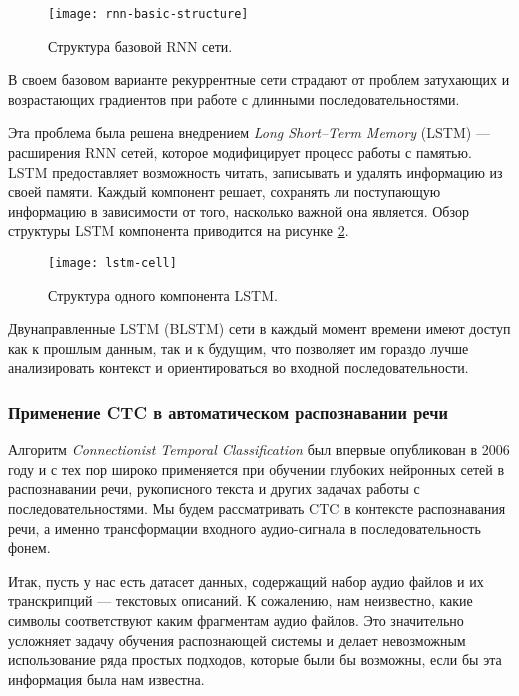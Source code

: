 \begin{figure}[h]
	\centering
	\texttt{[image: rnn-basic-structure]}
	\caption{Структура базовой RNN сети.}
	\label{fig:rnn-basic-structure}
\end{figure}

В своем базовом варианте рекуррентные сети страдают от проблем затухающих и возрастающих градиентов при работе с длинными последовательностями.

Эта проблема была решена внедрением \emph{Long Short--Term Memory} (LSTM)\cite{hochreiter1997long} --- расширения RNN сетей, которое модифицирует процесс работы с памятью. LSTM предоставляет возможность читать, записывать и удалять информацию из своей памяти. Каждый компонент решает, сохранять ли поступающую информацию в зависимости от того, насколько важной она является. Обзор структуры LSTM компонента приводится на рисунке \ref{fig:lstm-cell}.

\begin{figure}[h]
	\centering
	\texttt{[image: lstm-cell]}
	\caption{Структура одного компонента LSTM.}
	\label{fig:lstm-cell}
\end{figure}

Двунаправленные LSTM (BLSTM) сети\cite{graves2013speech, huang2015bidirectional} в каждый момент времени имеют доступ как к прошлым данным, так и к будущим, что позволяет им гораздо лучше анализировать контекст и ориентироваться во входной последовательности.

\subsubsection{Применение CTC в автоматическом распознавании речи}
Алгоритм \emph{Connectionist Temporal Classification} был впервые опубликован в 2006 году\cite{graves2006connectionist} и с тех пор широко применяется при обучении глубоких нейронных сетей в распознавании речи, рукописного текста и других задачах работы с последовательностями. Мы будем рассматривать CTC в контексте распознавания речи, а именно трансформации входного аудио-сигнала в последовательность фонем.

Итак, пусть у нас есть датасет данных, содержащий набор аудио файлов и их транскрипций --- текстовых описаний. К сожалению, нам неизвестно, какие символы соответствуют каким фрагментам аудио файлов. Это значительно усложняет задачу обучения распознающей системы и делает невозможным использование ряда простых подходов, которые были бы возможны, если бы эта информация была нам известна.

